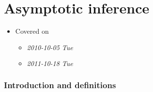 
\part*{Asymptotic inference}%

\begin{itemize}
\item Covered on
\begin{itemize}
\item \textit{2010-10-05 Tue}
\item \textit{2011-10-18 Tue}
\end{itemize}
\end{itemize}
\section{Introduction and definitions}
\label{sec-1}


